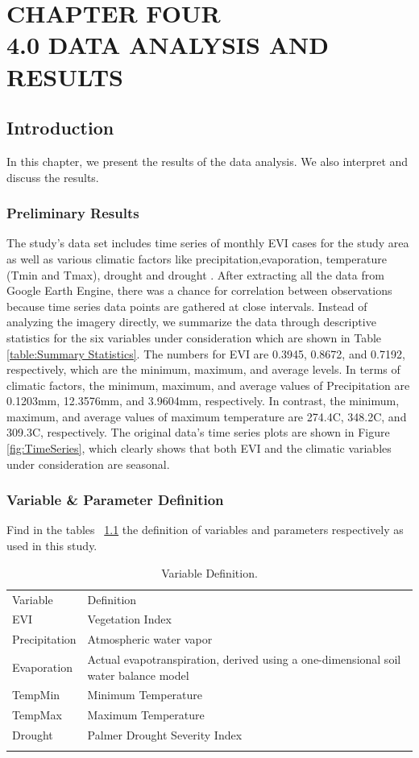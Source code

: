 
\chapter{CHAPTER FOUR\\4.0 DATA ANALYSIS AND RESULTS} %
\section{Introduction}
In this chapter, we present the results of the data analysis. We also interpret and discuss the results. 

\subsection{Preliminary Results}
The study's data set includes time series of monthly EVI cases for the study area as well as various climatic factors like precipitation,evaporation, temperature (Tmin and Tmax), drought and drought . After extracting all the data from  Google Earth Engine, there was a chance for correlation between observations because time series data points are gathered at close intervals. Instead of analyzing the imagery directly, we  summarize the data through descriptive statistics for the six variables under consideration which are shown in Table \ref{table:Summary Statistics}. The numbers for EVI are 0.3945, 0.8672, and 0.7192, respectively, which are the minimum, maximum, and average levels. In terms of climatic factors, the minimum, maximum, and average values of Precipitation are 0.1203mm, 12.3576mm, and 3.9604mm, respectively. In contrast, the minimum, maximum, and average values of maximum temperature are 274.4C, 348.2C, and 309.3C, respectively. The original data's time series plots are shown in Figure \ref{fig:TimeSeries}, which clearly shows that both EVI and the climatic variables under consideration are seasonal. 
\subsection{Variable \& Parameter Definition}
Find in the tables ~\ref{label:Variable}  the definition of variables and parameters respectively as used in this study. 
\begin{table}
	\label{label:Variable}
	\caption{Variable Definition.}
	\centering
	\begin{tabularx}{\textwidth}{ll}
		\hline\noalign{\smallskip}
		Variable & Definition \\ 
		\noalign{\smallskip}\hline\noalign{\smallskip}
	     EVI          & Vegetation Index\\  
		Precipitation & Atmospheric water vapor  \\ 
		Evaporation   & Actual evapotranspiration, derived using a one-dimensional soil water balance model\\ 
		TempMin       & Minimum Temperature \\ 
		TempMax       & Maximum Temperature \\
		Drought       &Palmer Drought Severity Index\\
		\hline\noalign{\smallskip}
	\end{tabularx}
\end{table}
